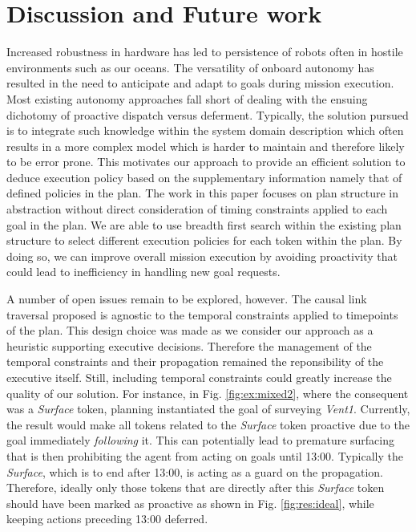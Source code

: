 \section{Discussion and Future work}
\label{sec:conclude}

Increased robustness in hardware has led to persistence of robots
often in hostile environments such as our oceans. The versatility of
onboard autonomy has resulted in the need to anticipate and adapt to
goals during mission execution.  Most existing autonomy approaches
fall short of dealing with the ensuing dichotomy of proactive dispatch
versus deferment.  Typically, the solution pursued is to integrate
such knowledge within the system domain description which often
results in a more complex model which is harder to maintain and
therefore likely to be error prone.  This motivates our approach to
provide an efficient solution to deduce execution policy based on the
supplementary information namely that of defined policies in the plan.
The work in this paper focuses on plan structure in abstraction
without direct consideration of timing constraints applied to each
goal in the plan. We are able to use breadth first search within the
existing plan structure to select different execution policies for
each token within the plan. By doing so, we can improve overall
mission execution by avoiding proactivity that could lead to
inefficiency in handling new goal requests.

A number of open issues remain to be explored, however. The causal
link traversal proposed is agnostic to the temporal constraints
applied to timepoints of the plan. This design choice was made as we
consider our approach as a heuristic supporting executive
decisions. Therefore the management of the temporal constraints and
their propagation remained the reponsibility of the executive itself.
Still, including temporal constraints
could greatly increase the quality of our solution.  For instance, in
Fig. \ref{fig:ex:mixed2}, where the consequent was a {\em Surface}
token, planning instantiated the goal of surveying
\emph{Vent1}. Currently, the result would make all tokens related to
the {\em Surface} token proactive due to the goal immediately
\emph{following} it.  This can potentially lead to premature surfacing
that is then prohibiting the agent from acting on goals until 13:00. Typically the
{\em Surface}, which is to end after 13:00, is acting as a guard on
the propagation.  Therefore, ideally only those tokens that are
directly after this {\em Surface} token should have been marked as
proactive as shown in Fig. \ref{fig:res:ideal}, while keeping actions
preceding 13:00 deferred.

